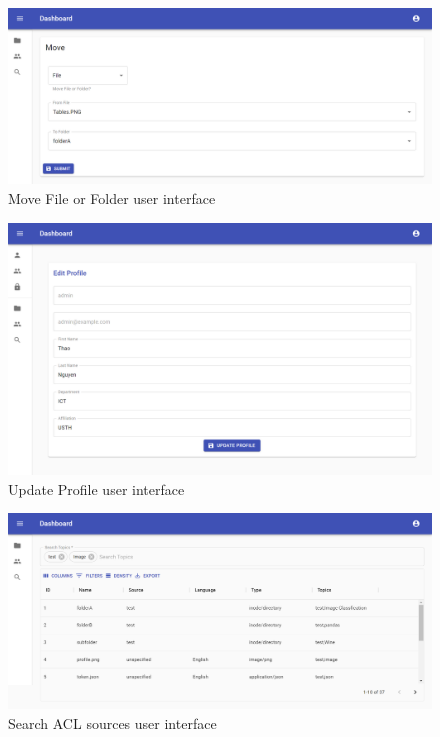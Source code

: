 \begin{figure}[H]
    \centering
    \includegraphics[width=1.0\textwidth]{images/Move.png}
    \caption{Move File or Folder user interface}
    \label{fig:moveContent}
\end{figure}
\begin{figure}[H]
    \centering
    \includegraphics[width=1.0\textwidth]{images/Update-Profile.png}
    \caption{Update Profile user interface}
    \label{fig:updateProfile}
\end{figure}
\begin{figure}[H]
    \centering
    \includegraphics[width=1.0\textwidth]{images/Search-Dataset.png}
    \caption{Search ACL sources user interface}
    \label{fig:searchContent}
\end{figure}
